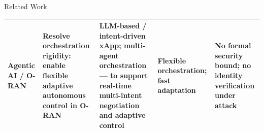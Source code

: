 \documentclass[aspectratio=169,10pt]{beamer}
\begin{document}
\begin{frame}[t,shrink=30]{Related Work}{}
\begin{tabular}{p{1.8cm}|p{2.8cm}|p{2.8cm}|p{1.7cm}|p{2.0cm}}
    \midrule
    \textbf{Agentic AI / O-RAN} \newline \cite{toward_autonomous_oran_2026,demirel2026agentic}
      & Resolve \textbf{orchestration rigidity}: enable flexible adaptive autonomous control in O-RAN
      & LLM-based / intent-driven xApp; multi-agent orchestration — to support real-time multi-intent negotiation and adaptive control
      & Flexible orchestration; fast adaptation
      & \textbf{No formal security bound;} no identity verification under attack \\
    \bottomrule
  \end{tabular}
\end{frame}

\end{document}
